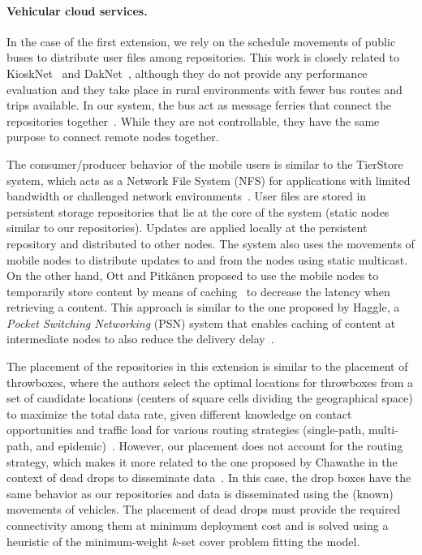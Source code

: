 \paragraph{Vehicular cloud services.}
In the case of the first extension, we rely on the schedule movements of public buses to distribute user files among repositories. This work is closely related to KioskNet~\cite{seth2006low} and DakNet~\cite{pentland2004daknet}, although they do not provide any performance evaluation and they take place in rural environments with fewer bus routes and trips available. In our system, the bus act as message ferries that connect the repositories together~\cite{zhao2004message}. While they are not controllable, they have the same purpose to connect remote nodes together.

The consumer/producer behavior of the mobile users is similar to the TierStore system, which acts as a Network File System (NFS) for applications with limited bandwidth or challenged network environments~\cite{demmer2008tierstore}. User files are stored in persistent storage repositories that lie at the core of the system (\ie static nodes similar to our repositories). Updates are applied locally at the persistent repository and distributed to other nodes. The system also uses the movements of mobile nodes to distribute updates to and from the nodes using static multicast. On the other hand, Ott and Pitk{\"a}nen proposed to use the mobile nodes to temporarily store content by means of caching~\cite{pitkanen2007redundancy,ott2007dtn} to decrease the latency when retrieving a content. This approach is similar to the one proposed by Haggle, a \textit{Pocket Switching Networking} (PSN) system that enables caching of content at intermediate nodes to also reduce the delivery delay~\cite{scott2006haggle}.

The placement of the repositories in this extension is similar to the placement of throwboxes, where the authors select the optimal locations for throwboxes from a set of candidate locations (\ie centers of square cells dividing the geographical space) to maximize the total data rate, given different knowledge on contact opportunities and traffic load for various routing strategies (\ie single-path, multi-path, and epidemic)~\cite{zhao2006capacity}. However, our placement does not account for the routing strategy, which makes it more related to the one proposed by Chawathe in the context of dead drops to disseminate data~\cite{chawathe2006inter}. In this case, the drop boxes have the same behavior as our repositories and data is disseminated using the (known) movements of vehicles. The placement of dead drops must provide the required connectivity among them at minimum deployment cost and is solved using a heuristic of the minimum-weight $k$-set cover problem fitting the model.

